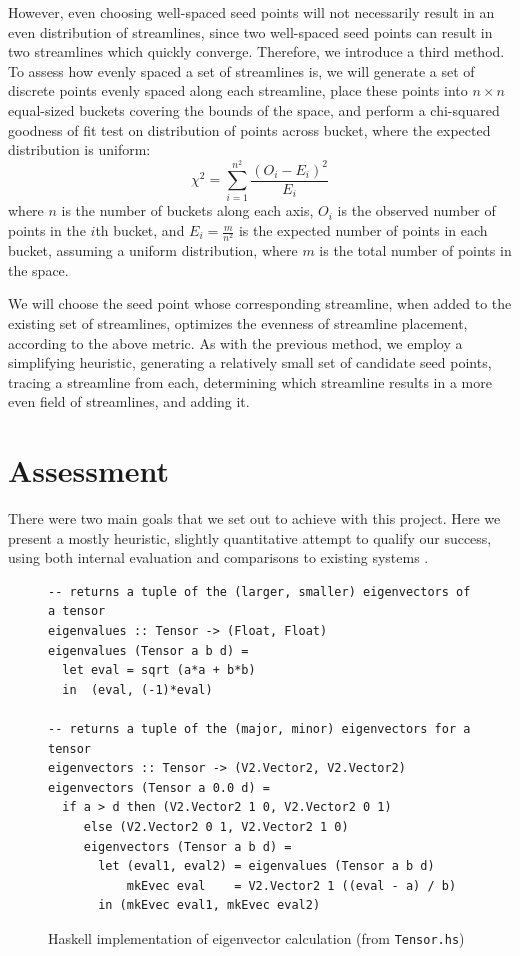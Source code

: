 \documentclass[twocolumn]{article}
\begin{document}
However, even choosing well-spaced seed points will not necessarily result in
an even distribution of streamlines, since two well-spaced seed points can
result in two streamlines which quickly converge. Therefore, we introduce a
third method. To assess how evenly spaced a set of streamlines is, we will
generate a set of discrete points evenly spaced along each streamline, place
these points into $n\times n$ equal-sized buckets covering the bounds of the
space, and perform a chi-squared goodness of fit test on distribution of points
across bucket, where the expected distribution is uniform:
\[
    \chi^2 = \sum_{i=1}^{n^2} \frac{(O_i-E_i)^2}{E_i}
\]
where $n$ is the number of buckets along each axis, $O_i$ is the observed
number of points in the $i$th bucket, and $E_i=\frac{m}{n^2}$ is the
expected number of points in each bucket, assuming a uniform distribution,
where $m$ is the total number of points in the space.

We will choose the seed point whose corresponding streamline, when added to the
existing set of streamlines, optimizes the evenness of streamline placement,
according to the above metric. As with the previous method, we employ a
simplifying heuristic, generating a relatively small set of candidate seed
points, tracing a streamline from each, determining which streamline results in
a more even field of streamlines, and adding it.

\section{Assessment}
There were two main goals that we set out to achieve with this project. Here we
present a mostly heuristic, slightly quantitative attempt to qualify our
success, using both internal evaluation and comparisons to existing systems
\cite{chen}.

\begin{figure}[t!]
\begin{verbatim}
-- returns a tuple of the (larger, smaller) eigenvectors of a tensor
eigenvalues :: Tensor -> (Float, Float)
eigenvalues (Tensor a b d) =
  let eval = sqrt (a*a + b*b)
  in  (eval, (-1)*eval)

-- returns a tuple of the (major, minor) eigenvectors for a tensor
eigenvectors :: Tensor -> (V2.Vector2, V2.Vector2)
eigenvectors (Tensor a 0.0 d) =
  if a > d then (V2.Vector2 1 0, V2.Vector2 0 1)
     else (V2.Vector2 0 1, V2.Vector2 1 0)
     eigenvectors (Tensor a b d) =
       let (eval1, eval2) = eigenvalues (Tensor a b d)
           mkEvec eval    = V2.Vector2 1 ((eval - a) / b)
       in (mkEvec eval1, mkEvec eval2)
\end{verbatim}
\caption{Haskell implementation of eigenvector calculation (from
            \texttt{Tensor.hs})}
\label{fig:evecs}
\end{figure}
\end{document}
